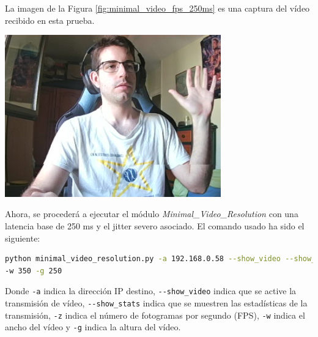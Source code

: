 \newpage
La imagen de la Figura \ref{fig:minimal_video_fps_250ms} es una captura del vídeo recibido en esta prueba.
\begin{center}
  \includegraphics[width = 0.7\textwidth]{images/VideoRecibido6.2.png}
  \label{fig:minimal_video_fps_250ms}
\end{center}

\newpage


Ahora, se procederá a ejecutar el módulo \textit{Minimal\_Video\_Resolution} con una latencia base de 250 ms y el jitter severo asociado. El comando usado ha sido el siguiente:

\begin{lstlisting}[language=bash,basicstyle=\ttfamily\scriptsize]
python minimal_video_resolution.py -a 192.168.0.58 --show_video --show_stats -z 12 \\
-w 350 -g 250
\end{lstlisting}
Donde \verb|-a| indica la dirección IP destino, \verb|--show_video| indica que se active la transmisión de vídeo, \verb|--show_stats| indica que se muestren las estadísticas de la transmisión, \verb|-z| indica el número de fotogramas por segundo (FPS), \verb|-w| indica el ancho del vídeo y \verb|-g| indica la altura del vídeo.
\vspace{\baselineskip}

